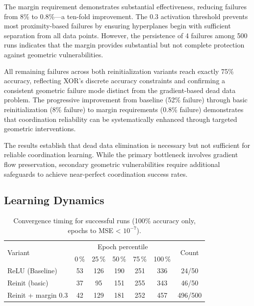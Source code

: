 The margin requirement demonstrates substantial effectiveness, reducing failures from 8\% to 0.8\%—a ten-fold improvement. The 0.3 activation threshold prevents most proximity-based failures by ensuring hyperplanes begin with sufficient separation from all data points. However, the persistence of 4 failures among 500 runs indicates that the margin provides substantial but not complete protection against geometric vulnerabilities.

All remaining failures across both reinitialization variants reach exactly 75\% accuracy, reflecting XOR's discrete accuracy constraints and confirming a consistent geometric failure mode distinct from the gradient-based dead data problem. The progressive improvement from baseline (52\% failure) through basic reinitialization (8\% failure) to margin requirements (0.8\% failure) demonstrates that coordination reliability can be systematically enhanced through targeted geometric interventions.

The results establish that dead data elimination is necessary but not sufficient for reliable coordination learning. While the primary bottleneck involves gradient flow preservation, secondary geometric vulnerabilities require additional safeguards to achieve near-perfect coordination success rates.


\subsection*{Learning Dynamics}

\begin{table}[ht]
\centering
\caption{Convergence timing for successful runs (100\% accuracy only, epochs to MSE < $10^{-7}$).}
\label{tab:relu1-reinit-timing}
\begin{tabular}{lcccccc}
\toprule
\multirow{2}{*}{Variant} &
\multicolumn{5}{c}{Epoch percentile} & \multirow{2}{*}{Count} \\
\cmidrule(lr){2-6}
& 0\,\% & 25\,\% & 50\,\% & 75\,\% & 100\,\% & \\
\midrule
ReLU (Baseline) & 53 & 126 & 190 & 251 & 336 & 24/50 \\
Reinit (basic) & 37 & 95 & 151 & 255 & 343 & 46/50 \\
Reinit + margin 0.3 & 42 & 129 & 181 & 252 & 457 & 496/500 \\
\bottomrule
\end{tabular}
\end{table}

